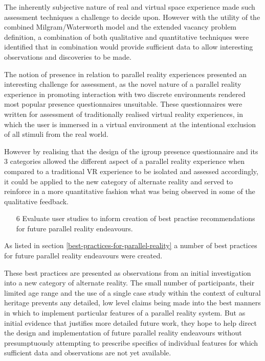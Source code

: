 The inherently subjective nature of real and virtual space experience made such assessment techniques a challenge to decide upon. However with the utility of the combined Milgram/Waterworth model and the extended vacancy problem definition, a combination of both qualitative and quantitative techniques were identified that in combination would provide sufficient data to allow interesting observations and discoveries to be made.

The notion of presence in relation to parallel reality experiences presented an interesting challenge for assessment, as the novel nature of a parallel reality experience in promoting interaction with two discrete environments rendered most popular presence questionnaires unsuitable. These questionnaires were written for assessment of traditionally realised virtual reality experiences, in which the user is immersed in a virtual environment at the intentional exclusion of all stimuli from the real world.

However by realising that the design of the igroup presence questionnaire and its 3 categories allowed the different aspect of a parallel reality experience when compared to a traditional VR experience to be isolated and assessed accordingly, it could be applied to the new category of alternate reality and served to reinforce in a more quantitative fashion what was being observed in some of the qualitative feedback.

\begin{enumerate}
	\item[6] Evaluate user studies to inform creation of best practise recommendations for future parallel reality endeavours.
\end{enumerate}

As listed in section \ref{best-practices-for-parallel-reality} a number of best practices for future parallel reality endeavours were created.

These best practices are presented as observations from an initial investigation into a new category of alternate reality. The small number of participants, their limited age range and the use of a single case study within the context of cultural heritage prevents any detailed, low level claims being made into the best manners in which to implement particular features of a parallel reality system. But as initial evidence that justifies more detailed future work, they hope to help direct the design and implementation of future parallel reality endeavours without presumptuously attempting to prescribe specifics of individual features for which sufficient data and observations are not yet available.

